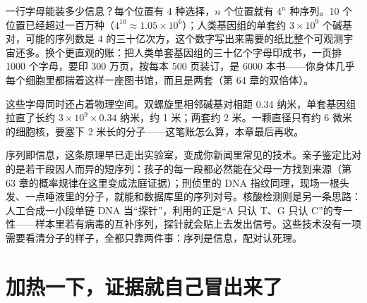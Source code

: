 一行字母能装多少信息？每个位置有 4 种选择，$n$ 个位置就有 $4^n$ 种序列。10 个位置已经超过一百万种（$4^{10}\approx 1.05\times 10^{6}$）；人类基因组的单套约 $3\times 10^{9}$ 个碱基对，可能的序列数是 $4$ 的三十亿次方，这个数字写出来需要的纸比整个可观测宇宙还多。换个更直观的账：把人类单套基因组的三十亿个字母印成书，一页排 1000 个字母，要印 300 万页，按每本 500 页装订，是 6000 本书——你身体几乎每个细胞里都揣着这样一座图书馆，而且是两套（第 64 章的双倍体）。

这些字母同时还占着物理空间。双螺旋里相邻碱基对相距 0.34 纳米，单套基因组拉直了长约 $3\times 10^{9}\times 0.34$ 纳米，约 1 米；两套约 2 米。一颗直径只有约 6 微米的细胞核，要塞下 2 米长的分子——这笔账怎么算，本章最后再收。

序列即信息，这条原理早已走出实验室，变成你新闻里常见的技术。亲子鉴定比对的是若干段因人而异的短序列：孩子的每一段都必然能在父母一方找到来源（第 63 章的概率规律在这里变成法庭证据）；刑侦里的 DNA 指纹同理，现场一根头发、一点唾液里的分子，就能和数据库里的序列对号。核酸检测则是另一条思路：人工合成一小段单链 DNA 当“探针”，利用的正是“A 只认 T、G 只认 C”的专一性——样本里若有病毒的互补序列，探针就会贴上去发出信号。这些技术没有一项需要看清分子的样子，全都只靠两件事：序列是信息，配对认死理。

\section{加热一下，证据就自己冒出来了}

